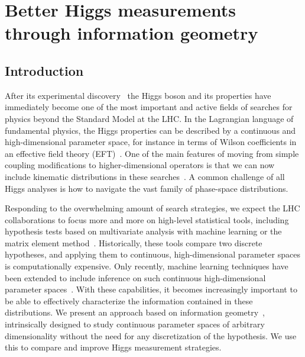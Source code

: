  
\chapter{Better Higgs measurements through information geometry}
\label{chapter:information}


\section{Introduction}
\label{sec:information_intro}

After its experimental discovery~\cite{higgs,discovery} the Higgs
boson and its properties have immediately become one of the most
important and active fields of searches for physics beyond the
Standard Model at the LHC.  In the Lagrangian language of fundamental
physics, the Higgs properties can be described by a continuous and
high-dimensional parameter space, for instance in terms of Wilson
coefficients in an effective field theory
(EFT)~\cite{eftfoundations,eftorig,eftreviews}. One of the main
features of moving from simple coupling modifications to
higher-dimensional operators is that we can now include kinematic
distributions in these searches~\cite{higgs_fit,yr4}. A common
challenge of all Higgs analyses is how to navigate the vast family of
phase-space distributions.

Responding to the overwhelming amount of search strategies, we expect
the LHC collaborations to focus more and more on high-level
statistical tools, including hypothesis tests based on multivariate
analysis with machine learning or the matrix element
method~\cite{statistics,kyle_review}. Historically, these tools
compare two discrete hypotheses, and applying them to continuous,
high-dimensional parameter spaces is computationally expensive.  Only
recently, machine learning techniques have been extended to include
inference on such continuous high-dimensional parameter
spaces~\cite{machine_learning}.  With these capabilities, it becomes
increasingly important to be able to effectively characterize the
information contained in these distributions.  We present an approach
based on information geometry~\cite{information-geometry},
intrinsically designed to study continuous parameter spaces of
arbitrary dimensionality without the need for any discretization of
the hypothesis. We use this to compare and improve Higgs measurement
strategies.

